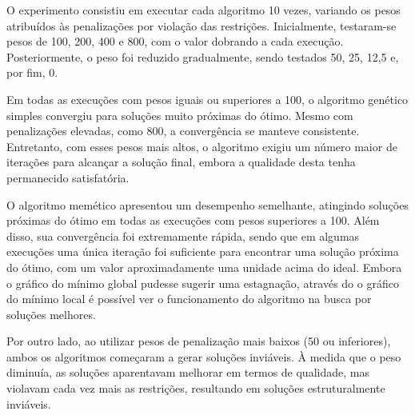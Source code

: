 O experimento consistiu em executar cada algoritmo 10 vezes, variando os pesos atribuídos às penalizações por violação das restrições. Inicialmente, testaram-se pesos de 100, 200, 400 e 800, com o valor dobrando a cada execução. Posteriormente, o peso foi reduzido gradualmente, sendo testados 50, 25, 12,5 e, por fim, 0.

Em todas as execuções com pesos iguais ou superiores a 100, o algoritmo genético simples convergiu para soluções muito próximas do ótimo. Mesmo com penalizações elevadas, como 800, a convergência se manteve consistente. Entretanto, com esses pesos mais altos, o algoritmo exigiu um número maior de iterações para alcançar a solução final, embora a qualidade desta tenha permanecido satisfatória.


O algoritmo memético apresentou um desempenho semelhante, atingindo soluções próximas do ótimo em todas as execuções com pesos superiores a 100. Além disso, sua convergência foi extremamente rápida, sendo que em algumas execuções uma única iteração foi suficiente para encontrar uma solução próxima do ótimo, com um valor aproximadamente uma unidade acima do ideal. Embora o gráfico do mínimo global pudesse sugerir uma estagnação, através do o gráfico do mínimo local é possível ver o funcionamento do algoritmo na busca por soluções melhores.

Por outro lado, ao utilizar pesos de penalização mais baixos (50 ou inferiores), ambos os algoritmos começaram a gerar soluções inviáveis. À medida que o peso diminuía, as soluções aparentavam melhorar em termos de qualidade, mas violavam cada vez mais as restrições, resultando em soluções estruturalmente inviáveis.




